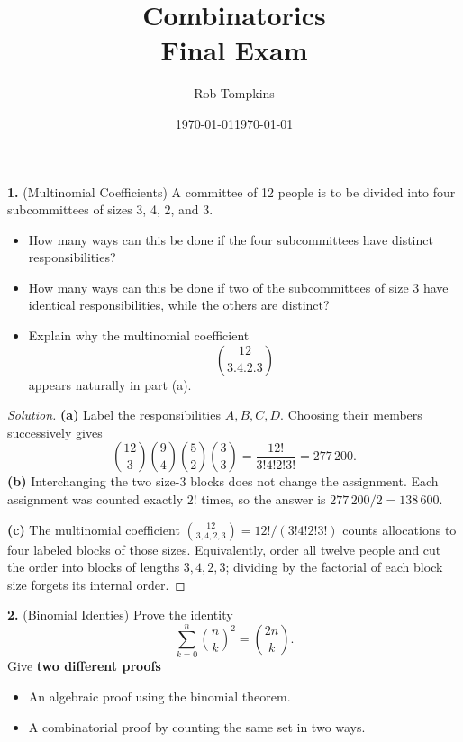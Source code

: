 \documentclass[12pt]{amsart}
\title{Combinatorics\\Final Exam}
\author{Rob Tompkins}
\date{\today}
\newenvironment{solution}
{\begin{proof}[Solution]}
{\end{proof}}
\begin{document}
    \maketitle
    \date{\today}
    \begin{onehalfspace}
        \noindent\textbf{1.} (Multinomial Coefficients) A committee of 12 people is to be divided into
        four subcommittees of sizes 3, 4, 2, and 3.
        \begin{itemize}
            \item[(a)] How many ways can this be done if the four subcommittees have distinct responsibilities?
            \item[(b)] How many ways can this be done if two of the subcommittees of size 3 have identical
            responsibilities, while the others are distinct?
            \item[(c)] Explain why the multinomial coefficient
            \[
                \binom{12}{3.4.2.3}
            \]
            appears naturally in part (a).
        \end{itemize}

        \begin{solution}
            \textbf{(a)} Label the responsibilities $A,B,C,D$. Choosing their
            members successively gives
            \[
                \binom{12}{3}\binom{9}{4}\binom{5}{2}\binom{3}{3}
                =\frac{12!}{3!4!2!3!}=277\,200.
            \]
            \textbf{(b)} Interchanging the two size-$3$ blocks does not change
            the assignment. Each assignment was counted exactly $2!$ times,
            so the answer is $277\,200/2=138\,600$.

            \textbf{(c)} The multinomial coefficient
            $\binom{12}{3,4,2,3}=12!/(3!4!2!3!)$ counts allocations to four
            labeled blocks of those sizes. Equivalently, order all twelve
            people and cut the order into blocks of lengths $3,4,2,3$;
            dividing by the factorial of each block size forgets its internal order.
        \end{solution}

        \noindent\textbf{2.} (Binomial Identies) Prove the identity
        \[
            \sum_{k=0}^n \binom{n}{k}^2 = \binom{2n}{k}.
        \]
        Give \textbf{two different proofs}
        \begin{itemize}
            \item[(a)] An algebraic proof using the binomial theorem.
            \item[(b)] A combinatorial proof by counting the same set in two ways.
        \end{itemize}


\end{onehalfspace}
\end{document}
